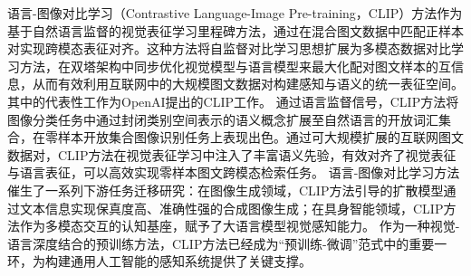 语言-图像对比学习\cite{radford2021learning}（Contrastive Language-Image Pre-training，CLIP）方法作为基于自然语言监督的视觉表征学习里程碑方法，通过在混合图文数据中匹配正样本对实现跨模态表征对齐。这种方法将自监督对比学习思想扩展为多模态数据对比学习方法，在双塔架构中同步优化视觉模型\cite{dosovitskiy2020vit,resnet}与语言模型\cite{Transformer}来最大化配对图文样本的互信息，从而有效利用互联网中的大规模图文数据对构建感知与语义的统一表征空间。其中的代表性工作为OpenAI提出的CLIP工作\cite{radford2021learning}。
通过语言监督信号，CLIP方法将图像分类任务中通过封闭类别空间表示的语义概念扩展至自然语言的开放词汇集合，在零样本开放集合图像识别任务上表现出色。通过可大规模扩展的互联网图文数据对，CLIP方法在视觉表征学习中注入了丰富语义先验，有效对齐了视觉表征与语言表征，可以高效实现零样本图文跨模态检索任务。
语言-图像对比学习方法催生了一系列下游任务迁移研究：在图像生成领域，CLIP方法引导的扩散模型\cite{dall-e2}通过文本信息实现保真度高、准确性强的合成图像生成；在具身智能领域，CLIP方法作为多模态交互的认知基座\cite{llava}，赋予了大语言模型视觉感知能力。
作为一种视觉-语言深度结合的预训练方法，CLIP方法已经成为“预训练-微调”范式中的重要一环，为构建通用人工智能的感知系统提供了关键支撑。





